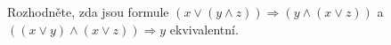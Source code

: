 \subsubsection{}
Rozhodněte, zda jsou formule $(x\vee (y\wedge z)) \Rightarrow (y \wedge (x\vee
z))$ a $((x \vee y)  \wedge (x\vee z))\Rightarrow y$ ekvivalentní.
